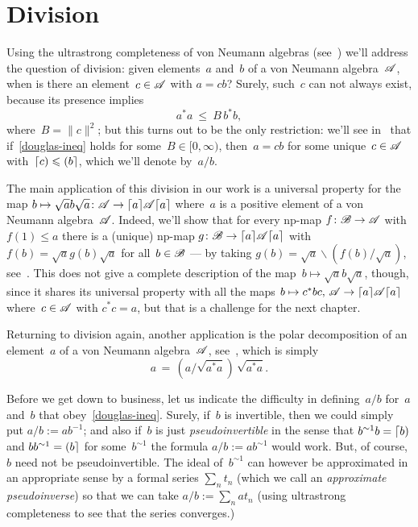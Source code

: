 \documentclass[a]{subfiles}
\begin{document}
\section{Division}
\label{S:division}
\begin{parsec}%
\begin{point}%
Using the ultrastrong completeness of von Neumann algebras
(see~)
we'll address
the question of division:
given elements~$a$ and~$b$ of a von Neumann algebra~$\mathscr{A}$,
when is there an element~$c\in\mathscr{A}$
with $a=cb$?
Surely, 
such~$c$ can not always exist,
because
its presence
implies
\begin{equation}
	\label{douglas-ineq}
	a^*a \ \leq \ B\, b^*b,
\end{equation}
where~$B=\|c\|^2$;
but this turns out to be the only restriction:
we'll see in~ that if~\eqref{douglas-ineq}
holds for some~$B\in [0,\infty)$,
then~$a=cb$ for some
unique~$c\in\mathscr{A}$
with~$\left\lceil c\right)\leqslant \left(b\right\rceil$,
which we'll denote by~$a/b$.

The main application of this division in our work
is a universal property
for the map $b\mapsto \sqrt{a}b\sqrt{a}\colon
\mathscr{A}\to\left\lceil a\right\rceil\!\mathscr{A}\!\left\lceil a\right\rceil$
where~$a$ is a positive element of a von Neumann algebra~$\mathscr{A}$.
Indeed,
we'll show that
for every np-map $f\colon \mathscr{B}\to \mathscr{A}$
with $f(1)\leq a$
there is a (unique) np-map $g\colon\mathscr{B}\to\left\lceil a\right\rceil\!\mathscr{A}\!\left\lceil a\right\rceil$
with~$f(b)=\sqrt{a}g(b)\sqrt{a}$ for all~$b\in\mathscr{B}$
---
by taking $g(b)=\sqrt{a}\backslash  (f(b) / \sqrt{a})$,
see~.
This does not give a complete description
of the map~$b\mapsto \sqrt{a}b\sqrt{a}$,
though,
since it shares its universal property
with all the maps
$b\mapsto c^*bc,\,\mathscr{A}\to\left\lceil a\right\rceil\!\mathscr{A}\!\left\lceil a\right\rceil$
where~$c\in\mathscr{A}$ with $c^*c = a$,
but that
is a  challenge for the next chapter.

Returning to division again,
another
application
is the polar decomposition
of an element~$a$ of a von Neumann algebra~$\mathscr{A}$,
see~,
which is simply
\begin{equation*}
	a \,=\, (a/ \sqrt{a^*a})\, \sqrt{a^*a}.
\end{equation*}

Before we get down to business,
let us indicate the difficulty
in defining~$a/b$
for~$a$ and~$b$ that obey~\eqref{douglas-ineq}.
Surely, if~$b$ is invertible,
then we could simply put $a/b:=ab^{-1}$;
and also if~$b$ is just \emph{pseudoinvertible}
in the sense that $b^{\sim 1 }b=\left\lceil b\right)$
and $bb^{\sim 1}=\left(b\right\rceil$
for some~$b^{\sim 1}$
the formula $a/b:=ab^{\sim 1}$ would work.
But,
of course,
$b$ need not be pseudoinvertible.
The  ideal of~$b^{\sim 1}$
can however be approximated
in an appropriate sense by a formal series $\sum_n t_n$ 
(which we call an \emph{approximate pseudoinverse})
so that we can take
$a/b:= \sum_n a t_n$
(using ultrastrong completeness to see that
the series converges.)
\end{point}
\end{parsec}
\end{document}
